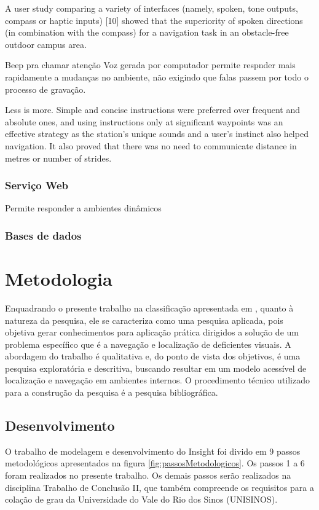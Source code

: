 \documentclass[english,brazilian]{UNISINOSmonografia}
\begin{document}
A user study comparing a variety of interfaces (namely, spoken, tone outputs, compass or haptic inputs) [10] showed that the superiority of spoken directions (in combination with the compass) for a navigation task in an obstacle-free outdoor campus area.


Beep pra chamar atenção
Voz gerada por computador permite respnder mais rapidamente a mudanças no ambiente, não exigindo que falas passem por todo o processo de gravação.

Less is more. Simple and concise instructions were preferred over frequent and absolute ones, and using instructions only at significant waypoints was an effective strategy as the station’s unique sounds and a user’s instinct also helped navigation. It also proved that there was no need to communicate distance in metres or number of strides.

		\subsection{Serviço Web}

Permite responder a ambientes dinâmicos


		\subsection{Bases de dados}

\chapter{Metodologia}
Enquadrando o presente trabalho na classificação apresentada em , quanto à natureza da pesquisa, ele se caracteriza como uma pesquisa aplicada, pois objetiva gerar conhecimentos para aplicação prática dirigidos a solução de um problema específico que é a navegação e localização de deficientes visuais. A abordagem do trabalho é qualitativa e, do ponto de vista dos objetivos, é uma pesquisa exploratória e descritiva, buscando resultar em um modelo acessível de localização e navegação em ambientes internos. O procedimento técnico utilizado para a construção da pesquisa é a pesquisa bibliográfica.

	\section{Desenvolvimento}
O trabalho de modelagem e desenvolvimento do Insight foi divido em 9 passos metodológicos apresentados na figura \ref{fig:passosMetodologicos}. Os passos 1 a 6 foram realizados no presente trabalho. Os demais passos serão realizados na disciplina Trabalho de Conclusão II, que também compreende os requisitos para a colação de grau da Universidade do Vale do Rio dos Sinos (UNISINOS).
\end{document}
